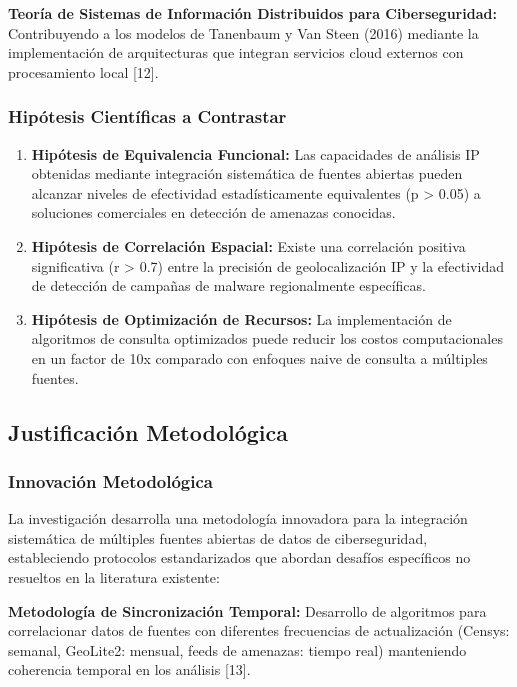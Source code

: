 \textbf{Teoría de Sistemas de Información Distribuidos para Ciberseguridad:} Contribuyendo a los modelos de Tanenbaum y Van Steen (2016) mediante la implementación de arquitecturas que integran servicios cloud externos con procesamiento local [12].

\subsubsection{Hipótesis Científicas a Contrastar}
\begin{enumerate}
    \item \textbf{Hipótesis de Equivalencia Funcional:} Las capacidades de análisis IP obtenidas mediante integración sistemática de fuentes abiertas pueden alcanzar niveles de efectividad estadísticamente equivalentes (p > 0.05) a soluciones comerciales en detección de amenazas conocidas.
    
    \item \textbf{Hipótesis de Correlación Espacial:} Existe una correlación positiva significativa (r > 0.7) entre la precisión de geolocalización IP y la efectividad de detección de campañas de malware regionalmente específicas.
    
    \item \textbf{Hipótesis de Optimización de Recursos:} La implementación de algoritmos de consulta optimizados puede reducir los costos computacionales en un factor de 10x comparado con enfoques naive de consulta a múltiples fuentes.
\end{enumerate}

\subsection{Justificación Metodológica}

\subsubsection{Innovación Metodológica}
La investigación desarrolla una metodología innovadora para la integración sistemática de múltiples fuentes abiertas de datos de ciberseguridad, estableciendo protocolos estandarizados que abordan desafíos específicos no resueltos en la literatura existente:

\textbf{Metodología de Sincronización Temporal:} Desarrollo de algoritmos para correlacionar datos de fuentes con diferentes frecuencias de actualización (Censys: semanal, GeoLite2: mensual, feeds de amenazas: tiempo real) manteniendo coherencia temporal en los análisis [13].

